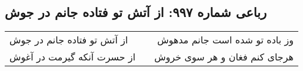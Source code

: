 \begin{center}
\section*{رباعی شماره ۹۹۷: از آتش تو فتاده جانم در جوش}
\label{sec:0997}
\begin{longtable}{l p{0.5cm} r}
از آتش تو فتاده جانم در جوش
&&
وز باده تو شده است جانم مدهوش
\\
از حسرت آنکه گیرمت در آغوش
&&
هرجای کنم فغان و هر سوی خروش
\\
\end{longtable}
\end{center}
